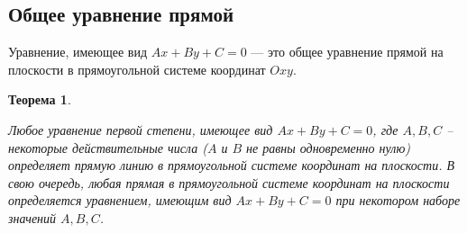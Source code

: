 \documentclass[a4paper,12pt]{extbook}
\newcommand{\newpar}{$ $\par\nobreak\ignorespaces}
\theoremstyle{numbered}
\theoremstyle{named}
\newtheorem*{theorem}{Теорема}
\theoremstyle{named}
\theoremstyle{named}
\begin{document}
\subsection*{Общее уравнение прямой}

Уравнение, имеющее вид \(Ax + By + C = 0\) — это общее уравнение прямой на плоскости в прямоугольной системе координат \(Oxy\).

\begin{theorem}
    \newpar
    Любое уравнение первой степени, имеющее вид \(Ax + By + C = 0\), где \(A, B, C\) – некоторые действительные числа (\(A\) и \(B\) не равны одновременно нулю) определяет прямую линию в прямоугольной системе координат на плоскости.
    В свою очередь, любая прямая в прямоугольной системе координат на плоскости определяется уравнением, имеющим вид \(Ax + By + C = 0\) при некотором наборе значений \(A, B, C\).
\end{theorem}
\end{document}
